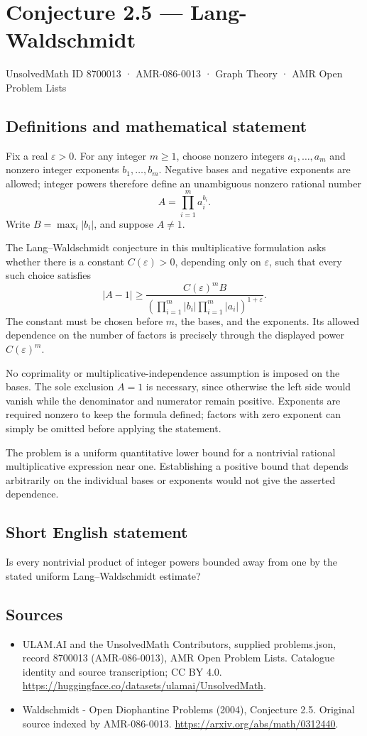 \documentclass[11pt,a4paper]{article}
\begin{document}
\section*{Conjecture 2.5 — Lang-Waldschmidt}\label{8700013}
{\small UnsolvedMath ID 8700013 · AMR-086-0013 · Graph Theory · AMR Open Problem Lists}
\subsection{Definitions and mathematical statement}
Fix a real $\varepsilon>0$. For any integer $m\ge1$, choose nonzero integers $a_1,\ldots,a_m$ and nonzero integer exponents $b_1,\ldots,b_m$. Negative bases and negative exponents are allowed; integer powers therefore define an unambiguous nonzero rational number
\[
A=\prod_{i=1}^m a_i^{b_i}.
\]
Write $B=\max_i|b_i|$, and suppose $A\ne1$.

The Lang--Waldschmidt conjecture in this multiplicative formulation asks whether there is a constant $C(\varepsilon)>0$, depending only on $\varepsilon$, such that every such choice satisfies
\[
|A-1|\ge
\frac{C(\varepsilon)^m B}
 {\left(\prod_{i=1}^m|b_i|\prod_{i=1}^m|a_i|\right)^{1+\varepsilon}}.
\]
The constant must be chosen before $m$, the bases, and the exponents. Its allowed dependence on the number of factors is precisely through the displayed power $C(\varepsilon)^m$.

No coprimality or multiplicative-independence assumption is imposed on the bases. The sole exclusion $A=1$ is necessary, since otherwise the left side would vanish while the denominator and numerator remain positive. Exponents are required nonzero to keep the formula defined; factors with zero exponent can simply be omitted before applying the statement.

The problem is a uniform quantitative lower bound for a nontrivial rational multiplicative expression near one. Establishing a positive bound that depends arbitrarily on the individual bases or exponents would not give the asserted dependence.
\subsection{Short English statement}
Is every nontrivial product of integer powers bounded away from one by the stated uniform Lang–Waldschmidt estimate?
\subsection{Sources}
\begin{itemize}
\item[S1] ULAM.AI and the UnsolvedMath Contributors, supplied problems.json, record 8700013 (AMR-086-0013), AMR Open Problem Lists. Catalogue identity and source transcription; CC BY 4.0.
\url{https://huggingface.co/datasets/ulamai/UnsolvedMath}.
\item[S2] Waldschmidt - Open Diophantine Problems (2004), Conjecture 2.5. Original source indexed by AMR-086-0013.
\url{https://arxiv.org/abs/math/0312440}.
\end{itemize}
\end{document}
